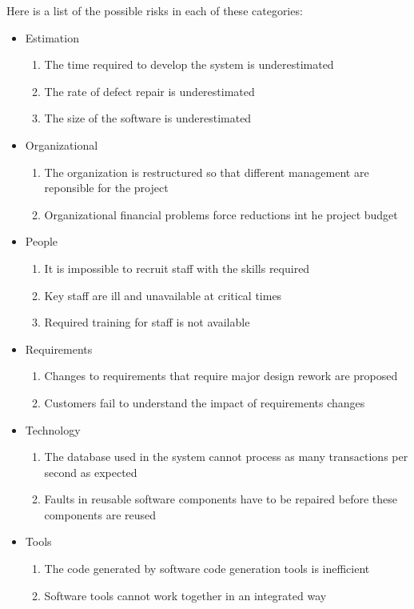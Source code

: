 Here is a list of the possible risks in each of these categories:
\begin{itemize}
    \item Estimation
    \begin{enumerate}
        \item The time required to develop the system is underestimated
        \item The rate of defect repair is underestimated
        \item The size of the software is underestimated
    \end{enumerate}
    \item Organizational
    \begin{enumerate}
        \item The organization is restructured so that different management are reponsible for the project
        \item Organizational financial problems force reductions int he project budget
    \end{enumerate}
    \item People
    \begin{enumerate}
        \item It is impossible to recruit staff with the skills required
        \item Key staff are ill and unavailable at critical times
        \item Required training for staff is not available
    \end{enumerate}
    \item Requirements
    \begin{enumerate}
        \item Changes to requirements that require major design rework are proposed
        \item Customers fail to understand the impact of requirements changes
    \end{enumerate}
    \item Technology
    \begin{enumerate}
        \item The database used in the system cannot process as many transactions per second as expected
        \item Faults in reusable software components have to be repaired before these components are reused
    \end{enumerate}
    \item Tools
    \begin{enumerate}
        \item The code generated by software code generation tools is inefficient
        \item Software tools cannot work together in an integrated way
    \end{enumerate}
\end{itemize}


